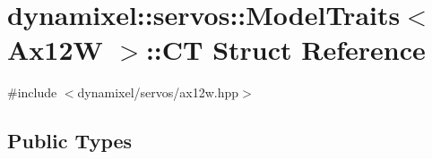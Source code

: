 \hypertarget{structdynamixel_1_1servos_1_1_model_traits_3_01_ax12_w_01_4_1_1_c_t}{}\section{dynamixel\+:\+:servos\+:\+:Model\+Traits$<$ Ax12\+W $>$\+:\+:C\+T Struct Reference}
\label{structdynamixel_1_1servos_1_1_model_traits_3_01_ax12_w_01_4_1_1_c_t}


{\ttfamily \#include $<$dynamixel/servos/ax12w.\+hpp$>$}

\subsection*{Public Types}
